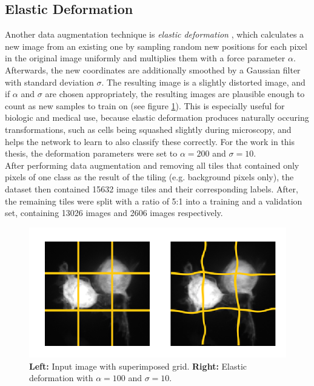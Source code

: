 		\subsection{Elastic Deformation}
Another data augmentation technique is \textit{elastic deformation} \cite{elastic}, which calculates a new image from an existing one by sampling random new positions for each pixel in the original image uniformly and multiplies them with a force parameter $\alpha$. Afterwards, the new coordinates are additionally smoothed by a Gaussian filter with standard deviation $\sigma$. The resulting image is a slightly distorted image, and if $\alpha$ and $\sigma$ are chosen appropriately, the resulting images are plausible enough to count as new samples to train on (see figure \ref{fig:elastic}). This is especially useful for biologic and medical use, because elastic deformation produces naturally occuring transformations, such as cells being squashed slightly during microscopy, and helps the network to learn to also classify these correctly. For the work in this thesis, the deformation parameters were set to $\alpha = 200$ and $\sigma = 10$.\\

\noindent After performing data augmentation and removing all tiles that contained only pixels of one class as the result of the tiling (e.g. background pixels only), the dataset then contained 15632 image tiles and their corresponding labels. After, the remaining tiles were split with a ratio of 5:1 into a training and a validation set, containing 13026 images and 2606 images respectively.



\begin {figure}[!ht]
	\begin{center}
		\includegraphics[scale=0.80]{img/fig_elastic.png}
	\end{center}
	\caption[]{\textbf{Left:} Input image with superimposed grid. \textbf{Right:} Elastic deformation with $\alpha = 100$ and $\sigma = 10$.}
	\label{fig:elastic}
\end {figure}

